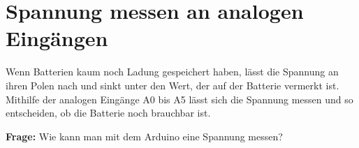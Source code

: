 \documentclass[ngerman, 11pt]{scrreprt}
\begin{document}
	\newpage
	\setcounter{chapter}{5}
	\setcounter{section}{1}
	
	\section{Spannung messen an analogen Eingängen}
	
	Wenn Batterien kaum noch Ladung gespeichert haben, lässt die Spannung an ihren Polen nach und sinkt unter den Wert, der auf der Batterie vermerkt ist. Mithilfe der analogen Eingänge A0 bis A5 lässt sich die Spannung messen und so entscheiden, ob die Batterie noch brauchbar ist.
	
	\begin{ziel}
		\textbf{Frage:} Wie kann man mit dem Arduino eine Spannung messen?
	\end{ziel}
	
\end{document}
